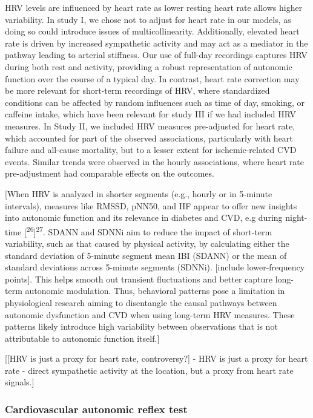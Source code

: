 \documentclass[
  a4paper,
  headsepline=true,
  open=any]{scrbook}
\begin{document}
HRV levels are influenced by heart rate as lower resting heart rate
allows higher variability. In study I, we chose not to adjust for heart
rate in our models, as doing so could introduce issues of
multicollinearity. Additionally, elevated heart rate is driven by
increased sympathetic activity and may act as a mediator in the pathway
leading to arterial stiffness. Our use of full-day recordings captures
HRV during both rest and activity, providing a robust representation of
autonomic function over the course of a typical day. In contrast, heart
rate correction may be more relevant for short-term recordings of HRV,
where standardized conditions can be affected by random influences such
as time of day, smoking, or caffeine intake, which have been relevant
for study III if we had included HRV measures. In Study II, we included
HRV measures pre-adjusted for heart rate, which accounted for part of
the observed associations, particularly with heart failure and all-cause
mortality, but to a lesser extent for ischemic-related CVD events.
Similar trends were observed in the hourly associations, where heart
rate pre-adjustment had comparable effects on the outcomes.

{[}When HRV is analyzed in shorter segments (e.g., hourly or in 5-minute
intervals), measures like RMSSD, pNN50, and HF appear to offer new
insights into autonomic function and its relevance in diabetes and CVD,
e.g during night-time {[}\textsuperscript{26}{]}\textsuperscript{27}.
SDANN and SDNNi aim to reduce the impact of short-term variability, such
as that caused by physical activity, by calculating either the standard
deviation of 5-minute segment mean IBI (SDANN) or the mean of standard
deviations across 5-minute segments (SDNNi). {[}include lower-frequency
points{]}. This helps smooth out transient fluctuations and better
capture long-term autonomic modulation. Thus, behavioral patterns pose a
limitation in physiological research aiming to disentangle the causal
pathways between autonomic dysfunction and CVD when using long-term HRV
measures. These patterns likely introduce high variability between
observations that is not attributable to autonomic function itself.{]}

{[}{[}HRV is just a proxy for heart rate, controversy?{]} - HRV is just
a proxy for heart rate - direct sympathetic activity at the location,
but a proxy from heart rate signals.{]}

\hypertarget{cardiovascular-autonomic-reflex-test}{%
\subsubsection{Cardiovascular autonomic reflex
test}\label{cardiovascular-autonomic-reflex-test}}
\end{document}
